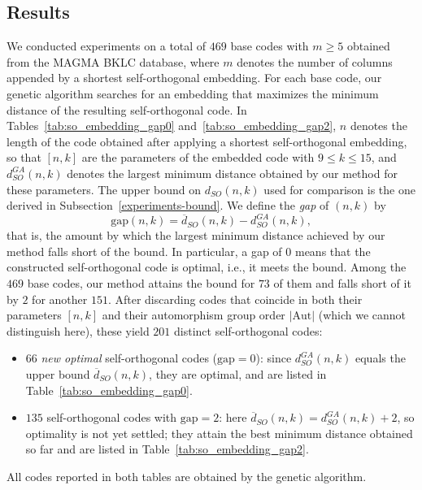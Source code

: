 \documentclass{article}
\begin{document}
\subsection{Results}
We conducted experiments on a total of $469$ base codes with $m\geq 5$ obtained from the MAGMA BKLC database, where $m$ denotes the number of columns appended by a shortest self-orthogonal embedding. For each base code, our genetic algorithm searches for an embedding that maximizes the minimum distance of the resulting self-orthogonal code. In Tables~\ref{tab:so_embedding_gap0} and~\ref{tab:so_embedding_gap2}, $n$ denotes the length of the code obtained after applying a shortest self-orthogonal embedding, so that $[n,k]$ are the parameters of the embedded code with $9\leq k\leq 15$, and $d_{SO}^{GA}(n,k)$ denotes the largest minimum distance obtained by our method for these parameters. The upper bound on $d_{SO}(n,k)$ used for comparison is the one derived in Subsection~\ref{experiments-bound}.
We define the \emph{gap} of $(n,k)$ by
\[
\mathrm{gap}(n,k)=\overline{d}_{SO}(n,k)-d_{SO}^{GA}(n,k),
\]
that is, the amount by which the largest minimum distance achieved by our method falls short of the bound. In particular, a gap of $0$ means that the constructed self-orthogonal code is optimal, i.e., it meets the bound.
Among the $469$ base codes, our method attains the bound for $73$ of them and falls short of it by $2$ for another $151$. After discarding codes that coincide in both their parameters $[n,k]$ and their automorphism group order $|\mathrm{Aut}|$ (which we cannot distinguish here), these yield $201$ distinct self-orthogonal codes:
\begin{itemize}
    \item $66$ \emph{new optimal} self-orthogonal codes ($\mathrm{gap}=0$): since $d_{SO}^{GA}(n,k)$ equals the upper bound $\overline{d}_{SO}(n,k)$, they are optimal, and are listed in Table~\ref{tab:so_embedding_gap0}.
    \item $135$ self-orthogonal codes with $\mathrm{gap}=2$: here $\overline{d}_{SO}(n,k)=d_{SO}^{GA}(n,k)+2$, so optimality is not yet settled; they attain the best minimum distance obtained so far and are listed in Table~\ref{tab:so_embedding_gap2}.
\end{itemize}
All codes reported in both tables are obtained by the genetic algorithm.

\begingroup
\footnotesize
\renewcommand{\arraystretch}{1.3}
\setlength{\tabcolsep}{4pt}
\end{document}
